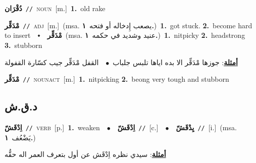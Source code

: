 \documentclass[10pt,a4paper,twoside]{article} %
\begin{document}
\begin{multicols}{2}
{\setlength\topsep{0pt}\textbf{\foreignlanguage{arabic}{دُقْرَان}}\ {\color{gray}\texttt{//}\color{black}}\ \textsc{noun}\ [m.]\ \textbf{1.}~old rake\ } \vspace{2mm}

{\setlength\topsep{0pt}\textbf{\foreignlanguage{arabic}{مْدَقِّر}}\ {\color{gray}\texttt{//}\color{black}}\ \textsc{adj}\ [m.]\ \color{gray}(msa. \foreignlanguage{arabic}{يصعب إِدخاله أو فتحه}~\foreignlanguage{arabic}{\textbf{١.}})\color{black}\ \textbf{1.}~got stuck.  \textbf{2.}~become hard to insert\ \ $\smblkdiamond$\ \ \setlength\topsep{0pt}\textbf{\foreignlanguage{arabic}{مْدَقِّر}}\ \color{gray}(msa. \foreignlanguage{arabic}{عنيد وشديد في حكمه}~\foreignlanguage{arabic}{\textbf{١.}})\color{black}\ \textbf{1.}~nitpicky  \textbf{2.}~headstrong  \textbf{3.}~stubborn\  \begin{flushright}\color{gray}\foreignlanguage{arabic}{\textbf{\underline{\foreignlanguage{arabic}{أمثلة}}}: جوزها مْدَقِّر الا بده اياها تلبس جلباب\ $\bullet$\ \  القفل مْدَقِّر جيب كسّارة القفولة}\end{flushright}\color{black}} \vspace{2mm}

{\setlength\topsep{0pt}\textbf{\foreignlanguage{arabic}{مْدَقِّر}}\ {\color{gray}\texttt{//}\color{black}}\ \textsc{noun\textunderscore act}\ [m.]\ \textbf{1.}~nitpicking  \textbf{2.}~beong very tough and stubborn\ } \vspace{2mm}

\vspace{-3mm}
\subsection*{\color{blue}\foreignlanguage{arabic}{د.ق.ش}\color{blue}{}} 

{\setlength\topsep{0pt}\textbf{\foreignlanguage{arabic}{اِدْقَشّ}}\ {\color{gray}\texttt{//}\color{black}}\ \textsc{verb}\ [p.]\ \textbf{1.}~weaken\ \ $\bullet$\ \ \setlength\topsep{0pt}\textbf{\foreignlanguage{arabic}{اِدْقَشّ}}\ {\color{gray}\texttt{//}\color{black}}\ [c.]\ \ $\bullet$\ \ \setlength\topsep{0pt}\textbf{\foreignlanguage{arabic}{يِدْقَشّ}}\ {\color{gray}\texttt{//}\color{black}}\ [i.]\ \color{gray}(msa. \foreignlanguage{arabic}{يَضْعُف}~\foreignlanguage{arabic}{\textbf{١.}})\color{black}\  \begin{flushright}\color{gray}\foreignlanguage{arabic}{\textbf{\underline{\foreignlanguage{arabic}{أمثلة}}}: سيدي نظره اِدْقَش عن أول بتعرف العمر اله حقُّه}\end{flushright}\color{black}} \vspace{2mm}


\end{multicols}
\end{document}
